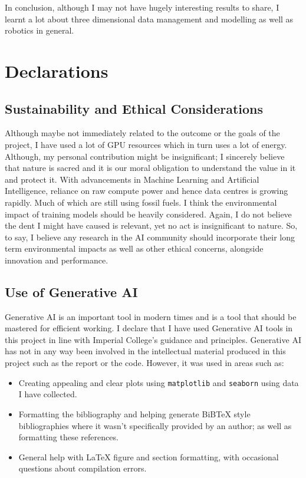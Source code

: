 In conclusion, although I may not have hugely interesting results to share, I learnt a lot about three dimensional data management and modelling as well as robotics in general.

\section{Declarations}
  \subsection{Sustainability and Ethical Considerations}
  Although maybe not immediately related to the outcome or the goals of the project, I have used a lot of GPU resources which in turn uses a lot of energy. Although, my personal contribution might be insignificant; I sincerely believe that nature is sacred and it is our moral obligation to understand the value in it and protect it. With advancements in Machine Learning and Artificial Intelligence, reliance on raw compute power and hence data centres is growing rapidly. Much of which are still using fossil fuels. I think the environmental impact of training models should be heavily considered. Again, I do not believe the dent I might have caused is relevant, yet no act is insignificant to nature. So, to say, I believe any research in the AI community should incorporate their long term environmental impacts as well as other ethical concerns, alongside innovation and performance.

  \subsection{Use of Generative AI}
  Generative AI is an important tool in modern times and is a tool that should be mastered for efficient working. 
  I declare that I have used Generative AI tools in this project in line with Imperial College's guidance and principles. Generative AI has not in any way been involved in the intellectual material produced in this project such as the report or the code. However, it was used in areas such as:
  \begin{itemize}
    \item Creating appealing and clear plots using \verb|matplotlib| and \verb|seaborn|  using data I have collected.
    \item Formatting the bibliography and helping generate BiBTeX style bibliographies where it wasn't specifically provided by an author; as well as formatting these references.
    \item General help with LaTeX figure and section formatting, with occasional questions about compilation errors.
  \end{itemize}

